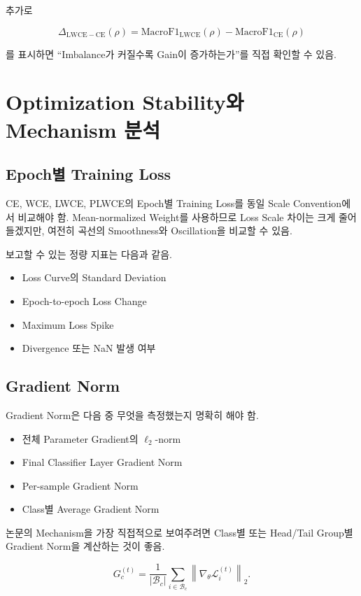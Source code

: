 \documentclass[11pt,a4paper]{article}
\begin{document}
추가로

\[
\Delta_{\mathrm{LWCE-CE}}(\rho)
=
\mathrm{MacroF1}_{\mathrm{LWCE}}(\rho)
-
\mathrm{MacroF1}_{\mathrm{CE}}(\rho)
\]

를 표시하면 ``Imbalance가 커질수록 Gain이 증가하는가''를 직접 확인할 수 있음.

\section{Optimization Stability와 Mechanism 분석}

\subsection{Epoch별 Training Loss}

CE, WCE, LWCE, PLWCE의 Epoch별 Training Loss를 동일 Scale Convention에서 비교해야 함. Mean-normalized Weight를 사용하므로 Loss Scale 차이는 크게 줄어들겠지만, 여전히 곡선의 Smoothness와 Oscillation을 비교할 수 있음.

보고할 수 있는 정량 지표는 다음과 같음.

\begin{itemize}
\item Loss Curve의 Standard Deviation
\item Epoch-to-epoch Loss Change
\item Maximum Loss Spike
\item Divergence 또는 NaN 발생 여부
\end{itemize}

\subsection{Gradient Norm}

Gradient Norm은 다음 중 무엇을 측정했는지 명확히 해야 함.

\begin{itemize}
\item 전체 Parameter Gradient의 \(\ell_2\)-norm
\item Final Classifier Layer Gradient Norm
\item Per-sample Gradient Norm
\item Class별 Average Gradient Norm
\end{itemize}

논문의 Mechanism을 가장 직접적으로 보여주려면 Class별 또는 Head/Tail Group별 Gradient Norm을 계산하는 것이 좋음.

\[
G_c^{(t)}
=
\frac{1}{|\mathcal{B}_c|}
\sum_{i\in\mathcal{B}_c}
\left\|
\nabla_{\theta}\mathcal{L}_i^{(t)}
\right\|_2.
\]
\end{document}

